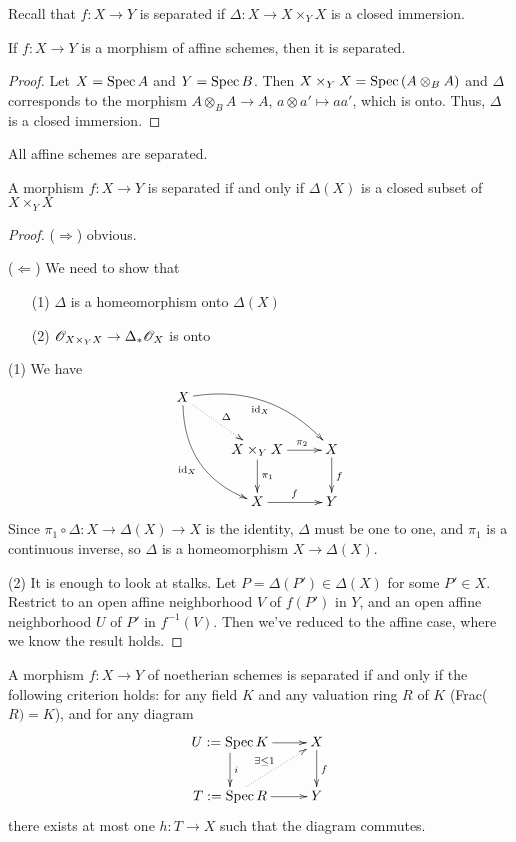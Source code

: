  \setcounter{lecture}{7}

Recall that $f:X\to Y$ is separated if $\Delta:X\to X\times_Y X$ is a closed
immersion.

\begin{proposition}
If $f:X\to Y$ is a morphism of affine schemes, then it is
separated.
\end{proposition}
\begin{proof}
Let $X=\text{\rm Spec\,} A$ and $Y=\text{\rm Spec\,} B$.  Then $X\times_Y X = \text{\rm Spec\,}
(A\otimes_B A)$ and $\Delta$ corresponds to the morphism
$A\otimes_B A\to A$, $a\otimes a'\mapsto aa'$, which is onto.
Thus, $\Delta$ is a closed immersion.
\end{proof}

\begin{corollary}
All affine schemes are separated.
\end{corollary}
\begin{corollary}
A morphism $f:X\to Y$ is separated if and only if $\Delta(X)$ is a
closed subset of $X\times_Y X$
\end{corollary}
\begin{proof}
($\Rightarrow$) obvious.

($\Leftarrow$) We need to show that
\begin{itemize}
 \item[(1)] $\Delta$ is a homeomorphism onto $\Delta(X)$
 \item[(2)] $\mathscr{O}_{X\times_Y X} \to \Delta_* \mathscr{O}_X$ is onto
\end{itemize}

(1) We have
\[\xymatrix{
 X\ar@/_4ex/[ddr]_{\text{id}_X}\ar@{.>}[dr]^{\Delta}
 \ar@/^4ex/[drr]_{\text{id}_X} \\
 & X\times_Y X \ar[r]^(.6){\pi_2} \ar[d]^{\pi_1} & X\ar[d]^f\\
 & X\ar[r]^f & Y
}\]
 Since $\pi_1\circ \Delta:X\to \Delta(X)\to X$ is the identity,
 $\Delta$ must be one to one, and $\pi_1$ is a continuous inverse,
 so $\Delta$ is a homeomorphism $X\to \Delta(X)$.

(2) It is enough to look at stalks.  Let $P=\Delta(P')\in
\Delta(X)$ for some $P'\in X$.  Restrict to an open affine
neighborhood $V$ of $f(P')$ in $Y$, and an open affine
neighborhood $U$ of $P'$ in $f^{-1}(V)$.  Then we've reduced to
the affine case, where we know the result holds.
\end{proof}

\begin{theorem}
A morphism $f:X\to Y$ of noetherian schemes is separated if and
only if the following criterion holds: for any field $K$ and any
valuation ring $R$ of $K$ (Frac($R)=K$), and for any diagram
\[\xymatrix{
 U:= \spec K \ar[r] \ar[d]^i & X\ar[d]^f\\
 T:= \spec R \ar[r] \ar@{.>}[ur]^{\exists \le 1} & Y
}\] there exists at most one $h:T\to X$ such that the diagram
commutes.
\end{theorem}

